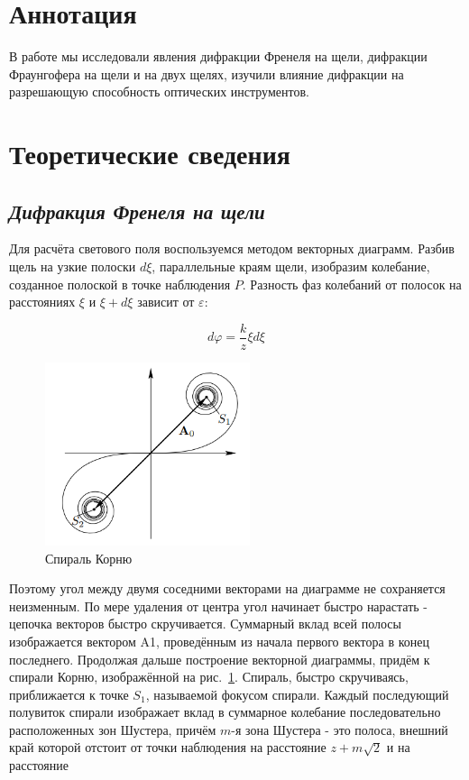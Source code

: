 \section*{Аннотация}
\indent В работе мы исследовали явления дифракции Френеля на щели, дифракции Фраунгофера на щели и на двух щелях, изучили влияние дифракции на разрешающую способность оптических инструментов.
\section*{Теоретические сведения}
\subsection*{\textit{Дифракция Френеля на щели}}

Для расчёта светового поля воспользуемся методом векторных диаграмм. Разбив щель на узкие полоски \( d\xi \), параллельные краям щели, изобразим колебание, созданное полоской в точке наблюдения \( P \). Разность фаз колебаний от полосок на расстояниях $\xi$ и $\xi + d\xi$
зависит от $\varepsilon$:

$$ d\varphi = \frac{k}{z}\xi d\xi$$

\begin{figure}
    \centering
    \includegraphics[width=6cm]{images/karnu.png}
    \caption{Спираль Корню}\label{fig:cornu}
\end{figure}

Поэтому угол между двумя соседними векторами на диаграмме не сохраняется неизменным.
По мере удаления от центра угол начинает быстро нарастать - цепочка векторов быстро скручивается.
Суммарный вклад всей полосы изображается вектором A1, проведённым из начала первого вектора в конец последнего.
Продолжая дальше построение векторной диаграммы, придём к спирали Корню, изображённой на рис.~\ref{fig:cornu}. Спираль, быстро скручиваясь, приближается к точке \(S_1\), называемой фокусом спирали. Каждый последующий полувиток спирали изображает вклад в суммарное колебание последовательно расположенных зон Шустера, причём \(m\)-я зона Шустера - это полоса, внешний край которой отстоит от точки наблюдения на расстояние \(z + m\sqrt{2}\) и на расстояние

